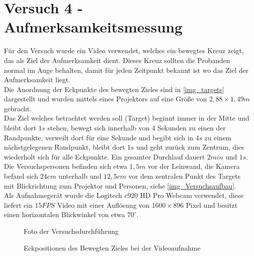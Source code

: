 \section{Versuch 4 - Aufmerksamkeitsmessung}
\label{VideoAnalyse}
Für den Versuch wurde ein Video verwendet, welches ein bewegtes Kreuz zeigt, das als Ziel der Aufmerksamkeit dient. Dieses Kreuz sollten die Probanden normal im Auge behalten, damit für jeden Zeitpunkt bekannt ist wo das Ziel der Aufmerksamkeit liegt.\\
Die Anordnung der Eckpunkte des bewegten Zieles sind in \autoref{img_targets} dargestellt und wurden mittels eines Projektors auf eine Größe von $2,88 \times 1,49 m$ gebracht.\\
Das Ziel welches betrachtet werden soll (Target) beginnt immer in der Mitte und bleibt dort $1s$ stehen, bewegt sich innerhalb von 4 Sekunden zu einen der Randpunkte, verweilt dort für eine Sekunde und begibt sich in $4s$ zu einem nächstgelegenen Randpunkt, bleibt dort $1s$ und geht zurück zum Zentrum, dies wiederholt sich für alle Eckpunkte. Ein gesamter Durchlauf dauert $2min$ und $1s$.\\
Die Versuchspersonen befinden sich etwa $1,5m$ vor der Leinwand, die Kamera befand sich $24cm$ unterhalb und $12,5cm$ vor dem zentralen Punkt des Targets mit Blickrichtung zum Projektor und Personen, siehe \autoref{img_Versuchsaufbau}.\\
Als Aufnahmegerät wurde die Logitech c920 HD Pro Webcam verwendet, diese liefert ein $15FPS$ Video mit einer Auflösung von $1600\times 896$ Pixel und besitzt einen horizontalen Blickwinkel von etwa $70^\circ$.\\
\begin{figure}
	\centering
	\caption{Foto der Versuchsdurchführung}
	\label{img_Versuchsaufbau}
\end{figure}
\begin{figure}
\centering
{}
\caption{Eckpositionen des Bewegten Zieles bei der Videoaufnahme}
\label{img_targets}
\end{figure}
